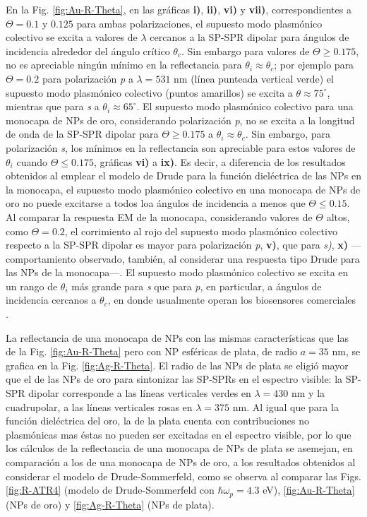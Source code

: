 En la Fig.  \ref{fig:Au-R-Theta}, en las gráficas \textbf{i)}, \textbf{ii)}, \textbf{vi)} y \textbf{vii)}, correspondientes a $\Theta=0.1$ y $0.125$ para ambas polarizaciones, el supuesto modo plasmónico colectivo se excita a valores de $\lambda$ cercanos a la SP-SPR dipolar para ángulos de incidencia alrededor del ángulo crítico $\theta_c$. Sin embargo para valores de $\Theta\geq 0.175$, no es apreciable ningún mínimo en la reflectancia para $\theta_i\approx\theta_c$; por ejemplo para $\Theta=0.2$ para polarización \emph{p} a $\lambda = 531$ nm (línea punteada vertical verde) el supuesto modo plasmónico colectivo (puntos amarillos) se excita a $\theta\approx 75^\circ$, mientras que para \emph{s} a $\theta_i\approx 65^\circ$. El supuesto modo plasmónico colectivo para una monocapa de NPs de oro, considerando polarización \emph{p}, no se excita a la longitud de onda de la SP-SPR dipolar para $\Theta\geq 0.175$ a $\theta_i\approx\theta_c$. Sin embargo, para polarización \emph{s}, los mínimos en la reflectancia son apreciable para estos valores de $\theta_i$ cuando $\Theta\leq 0.175$, gráficas \textbf{vi)} a \textbf{ix)}. Es decir, a diferencia de los resultados obtenidos al emplear el modelo de Drude para la función dieléctrica de las NPs en la monocapa, el supuesto modo plasmónico colectivo en una monocapa de NPs de oro no puede excitarse a todos loa ángulos de incidencia a menos que $\Theta\leq 0.15$. Al comparar la respuesta EM de la monocapa, considerando valores de $\Theta$ altos, como $\Theta=0.2$, el corrimiento al rojo del supuesto modo plasmónico colectivo respecto a la SP-SPR dipolar es mayor  para polarización \emph{p}, \textbf{v)}, que para \emph{s)}, \textbf{x)} ---comportamiento observado, también, al considerar una respuesta tipo Drude para las NPs de la monocapa---. El supuesto modo plasmónico colectivo se excita en un rango de $\theta_i$ más grande para \emph{s} que para \emph{p}, en particular, a ángulos de incidencia cercanos a $\theta_c$, en donde usualmente operan los biosensores comerciales \cite{svedendahl2009refractometric}.

La reflectancia de una monocapa de NPs con las mismas características que las de la Fig. \ref{fig:Au-R-Theta} pero con NP esféricas de plata, de radio $a=35$ nm, se grafica en la Fig. \ref{fig:Ag-R-Theta}. El radio de las NPs de plata se eligió mayor que el de las NPs de oro para sintonizar las SP-SPRs en el espectro visible: la SP-SPR dipolar corresponde a las líneas verticales verdes en $\lambda=430$ nm y la cuadrupolar, a las líneas verticales rosas en $\lambda=375$ nm. Al igual que para la función dieléctrica del oro, la de la plata cuenta con contribuciones no plasmónicas mas éstas no pueden ser excitadas en el espectro visible, por lo que los cálculos de la reflectancia de una monocapa de NPs de plata se asemejan, en comparación a los de una monocapa de NPs de oro, a los resultados obtenidos al considerar el modelo de Drude-Sommerfeld, como se observa al comparar las Figs. \ref{fig:R-ATR4} (modelo de Drude-Sommerfeld con $\hbar\omega_p=4.3$ eV), \ref{fig:Au-R-Theta} (NPs de oro) y \ref{fig:Ag-R-Theta} (NPs de plata).

